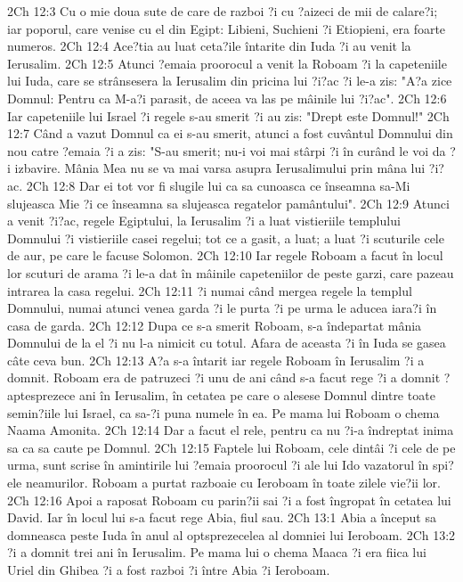 2Ch 12:3  Cu o mie doua sute de care de razboi ?i cu ?aizeci de mii de calare?i; iar poporul, care venise cu el din Egipt: Libieni, Suchieni ?i Etiopieni, era foarte numeros.
2Ch 12:4  Ace?tia au luat ceta?ile întarite din Iuda ?i au venit la Ierusalim.
2Ch 12:5  Atunci ?emaia proorocul a venit la Roboam ?i la capeteniile lui Iuda, care se strânsesera la Ierusalim din pricina lui ?i?ac ?i le-a zis: "A?a zice Domnul: Pentru ca M-a?i parasit, de aceea va las pe mâinile lui ?i?ac".
2Ch 12:6  Iar capeteniile lui Israel ?i regele s-au smerit ?i au zis: "Drept este Domnul!"
2Ch 12:7  Când a vazut Domnul ca ei s-au smerit, atunci a fost cuvântul Domnului din nou catre ?emaia ?i a zis: "S-au smerit; nu-i voi mai stârpi ?i în curând le voi da ?i izbavire. Mânia Mea nu se va mai varsa asupra Ierusalimului prin mâna lui ?i?ac.
2Ch 12:8  Dar ei tot vor fi slugile lui ca sa cunoasca ce înseamna sa-Mi slujeasca Mie ?i ce înseamna sa slujeasca regatelor pamântului".
2Ch 12:9  Atunci a venit ?i?ac, regele Egiptului, la Ierusalim ?i a luat vistieriile templului Domnului ?i vistieriile casei regelui; tot ce a gasit, a luat; a luat ?i scuturile cele de aur, pe care le facuse Solomon.
2Ch 12:10  Iar regele Roboam a facut în locul lor scuturi de arama ?i le-a dat în mâinile capeteniilor de peste garzi, care pazeau intrarea la casa regelui.
2Ch 12:11  ?i numai când mergea regele la templul Domnului, numai atunci venea garda ?i le purta ?i pe urma le aducea iara?i în casa de garda.
2Ch 12:12  Dupa ce s-a smerit Roboam, s-a îndepartat mânia Domnului de la el ?i nu l-a nimicit cu totul. Afara de aceasta ?i în Iuda se gasea câte ceva bun.
2Ch 12:13  A?a s-a întarit iar regele Roboam în Ierusalim ?i a domnit. Roboam era de patruzeci ?i unu de ani când s-a facut rege ?i a domnit ?aptesprezece ani în Ierusalim, în cetatea pe care o alesese Domnul dintre toate semin?iile lui Israel, ca sa-?i puna numele în ea. Pe mama lui Roboam o chema Naama Amonita.
2Ch 12:14  Dar a facut el rele, pentru ca nu ?i-a îndreptat inima sa ca sa caute pe Domnul.
2Ch 12:15  Faptele lui Roboam, cele dintâi ?i cele de pe urma, sunt scrise în amintirile lui ?emaia proorocul ?i ale lui Ido vazatorul în spi?ele neamurilor. Roboam a purtat razboaie cu Ieroboam în toate zilele vie?ii lor.
2Ch 12:16  Apoi a raposat Roboam cu parin?ii sai ?i a fost îngropat în cetatea lui David. Iar în locul lui s-a facut rege Abia, fiul sau.
2Ch 13:1  Abia a început sa domneasca peste Iuda în anul al optsprezecelea al domniei lui Ieroboam.
2Ch 13:2  ?i a domnit trei ani în Ierusalim. Pe mama lui o chema Maaca ?i era fiica lui Uriel din Ghibea ?i a fost razboi ?i între Abia ?i Ieroboam.
